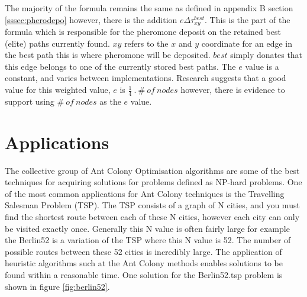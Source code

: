 The majority of the formula remains the same as defined in appendix B section \ref{sssec:pherodepo} however, there is the addition $e\Delta\tau_{xy}^{best}$. This is the part of the formula which is responsible for the pheromone deposit on the retained best (elite) paths currently found. $xy$ refers to the $x$ and $y$ coordinate for an edge in the best path this is where pheromone will be deposited. $best$ simply donates that this edge belongs to one of the currently stored best paths. The $e$ value is a constant, and varies between implementations. Research suggests that a good value for this weighted value, $e$ is $\frac{1}{4}\ .\ \#\ of \ nodes$ \cite{sjored:Thesus2012:evalue} however, there is evidence to support using $\#\ of \ nodes$ as the $e$ value\cite{marcdorgio:book:nopage}.

\section{Applications}

The collective group of Ant Colony Optimisation algorithms are some of the best techniques for acquiring solutions for problems defined as NP-hard problems. One of the most common applications for Ant Colony techniques is the Travelling Salesman Problem (TSP). The TSP consists of a graph of N cities, and you must find the shortest route between each of these N cities, however each city can only be visited exactly once. Generally this N value is often fairly large for example the Berlin52\cite{berlin52:source} is a variation of the TSP where this N value is 52. The number of possible routes between these 52 cities is incredibly large. The application of heuristic algorithms such at the Ant Colony methods enables solutions to be found within a reasonable time. One solution for the Berlin52.tsp problem is shown in figure \ref{fig:berlin52}.

